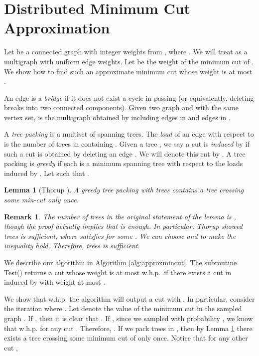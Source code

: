 \documentclass[11pt]{article}
\newtheorem{lemma}[theorem]{Lemma}
\newtheorem{remark}[theorem]{Remark}
\begin{document}
\section{Distributed Minimum Cut Approximation}
Let  be a connected graph with integer weights from , where . We will treat  as a multigraph with uniform edge weights.
Let  be the weight of the minimum cut of . We show how to find such an approximate minimum cut whose weight is at most . 

An edge  is a {\it bridge} if it does not exist a cycle in  passing  (or equivalently, deleting  breaks  into two connected components). Given two graph  and  with the same vertex set,  is the multigraph obtained by including edges in  and edges in .

A {\it tree packing}  is a multiset of spanning trees. The {\it load} of an edge  with respect to  is the number of trees in  containing . Given a tree , we say a cut is {\it induced} by  if such a cut is obtained by deleting an edge . We will denote this cut by . A tree packing  is {\it greedy} if each  is a minimum spanning tree with respect to the loads induced by . Let  such that .


\begin{lemma}[Thorup \cite{Thorup07}]\label{lem:treepacking}A greedy tree packing with  trees contains a tree crossing some min-cut only once.
\end{lemma}
\begin{remark}The number of trees in the original statement of the lemma is , though the proof actually implies that  is enough. In particular, Thorup showed  trees is sufficient, where  satisfies  for some . We can choose  and  to make the inequality hold. Therefore,  trees is sufficient.\end{remark}

We describe our algorithm in Algorithm \ref{alg:approxmincut}. The subroutine Test() returns a cut whose weight is at most  w.h.p.~if there exists a cut in  induced by  with weight at most .

We show that w.h.p. the algorithm will output a cut  with . In particular, consider the iteration  where . Let  denote the value of the minimum cut in the sampled graph . If , then it is clear that . If , since we sampled with probability , we know that w.h.p. for any cut  \cite[Corollary 2.4]{Karger94}, 
Therefore, . If we pack  trees in , then by Lemma \ref{lem:treepacking} there exists a tree crossing some minimum cut  of  only once. Notice that for any other cut , 
\end{document}

